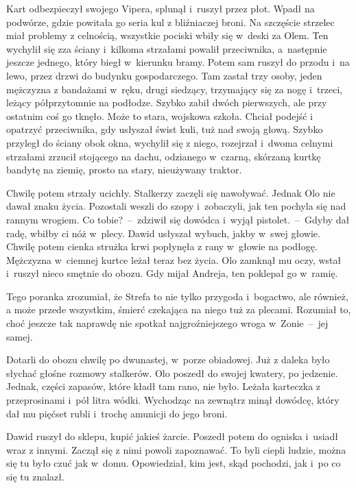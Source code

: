 \documentclass[../MAIN.tex]{subfiles}
\begin{document}
Kart odbezpieczył swojego Vipera, splunął i~ruszył przez płot. Wpadł na
podwórze, gdzie powitała go seria kul z bliźniaczej broni. Na szczęście strzelec
miał problemy z celnością, wszystkie pociski wbiły się w~deski za Olem. Ten
wychylił się zza ściany i~kilkoma strzałami powalił przeciwnika, a~następnie
jeszcze jednego, który biegł w~kierunku bramy. Potem sam ruszył do przodu i~na
lewo, przez drzwi do budynku gospodarczego.
Tam zastał trzy osoby, jeden
mężczyzna z bandażami w~ręku, drugi siedzący, trzymający się za nogę i~trzeci,
leżący półprzytomnie na podłodze. Szybko zabił dwóch pierwszych, ale przy
ostatnim coś go tknęło.
Może to stara, wojskowa szkoła. Chciał podejść i
opatrzyć przeciwnika, gdy usłyszał świst kuli, tuż nad swoją głową. Szybko
przyległ do ściany obok okna, wychylił się z niego, rozejrzał i~dwoma celnymi
strzałami zrzucił stojącego na dachu, odzianego w~czarną, skórzaną kurtkę
bandytę na ziemię, prosto na stary, nieużywany traktor.

Chwilę potem strzały ucichły. Stalkerzy zaczęli się nawoływać. Jednak Olo nie
dawał znaku życia. Pozostali weszli do szopy i~zobaczyli, jak ten pochyla się
nad rannym wrogiem.
\sd
\xx Co tobie?~--~zdziwił się dowódca i~wyjął pistolet.~--~Gdyby dał radę,
wbiłby ci nóż w~plecy.
\qm
Dawid usłyszał wybuch, jakby w~swej głowie. Chwilę potem cienka strużka krwi
popłynęła z rany w~głowie na podłogę. Mężczyzna w~ciemnej kurtce leżał teraz bez
życia. Olo zamknął mu oczy, wstał i~ruszył nieco smętnie do obozu. Gdy mijał
Andreja, ten poklepał go w~ramię.

Tego poranka zrozumiał, że Strefa to nie tylko przygoda i~bogactwo, ale również,
a może przede wszystkim, śmierć czekająca na niego tuż za plecami. Rozumiał to,
choć jeszcze tak naprawdę nie spotkał najgroźniejszego wroga w~Zonie~--~jej
samej.

Dotarli do obozu chwilę po dwunastej, w~porze obiadowej. Już z daleka było
słychać głośne rozmowy stalkerów. Olo poszedł do swojej kwatery, po jedzenie.
Jednak, części zapasów, które kładł tam rano, nie było.
Leżała karteczka z przeprosinami i~pół litra wódki. Wychodząc na zewnątrz minął dowódcę, który dał
mu pięćset rubli i~trochę amunicji do jego broni.

Dawid ruszył do sklepu, kupić jakieś żarcie. Poszedł potem do ogniska i~usiadł
wraz z innymi. Zaczął się z nimi powoli zapoznawać. To byli ciepli ludzie, można się tu
było czuć jak w~domu. Opowiedział, kim jest, skąd pochodzi, jak i~po co się tu
znalazł.
\end{document}
